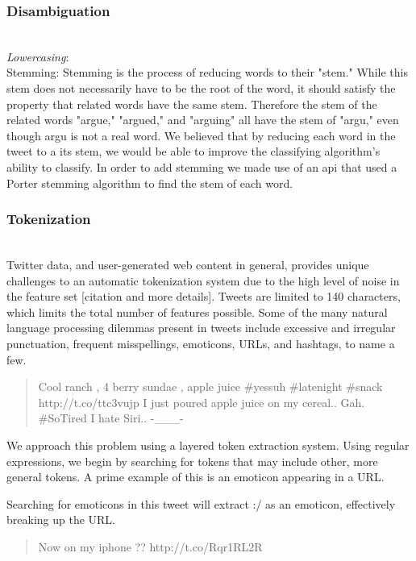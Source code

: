 \documentclass[letterpaper]{article}
\begin{document}
\subsubsection{Disambiguation}
~\\
\textit{Lowercasing}:\\
Stemming: Stemming is the process of reducing words to their "stem." While this stem does not necessarily have to be the root of the word, it should satisfy the property that related words have the same stem. Therefore the stem of the related words "argue," "argued," and "arguing" all have the stem of "argu," even though argu is not a real word. We believed that by reducing each word in the tweet to a its stem, we would be able to improve the classifying algorithm's ability to classify. In order to add stemming we made use of an api that used a Porter stemming algorithm to find the stem of each word.\\

\subsubsection{Tokenization}
~\\
Twitter data, and user-generated web content in general, provides unique challenges to an automatic tokenization system due to the high level of noise in the feature set [citation and more details]. Tweets are limited to 140 characters, which limits the total number of features possible. Some of the many natural language processing dilemmas present in tweets include excessive and irregular punctuation, frequent misspellings, emoticons, URLs, and hashtags, to name a few.\\

\begin{quote}
Cool ranch , 4 berry sundae , apple juice \#yessuh \#latenight \#snack http://t.co/ttc3vujp 
I just poured apple juice on my cereal.. Gah. \#SoTired 
I hate Siri.. -\_\_\_- 
\end{quote}

We approach this problem using a layered token extraction system. Using regular expressions, we begin by searching for tokens that may include other, more general tokens. A prime example of this is an emoticon appearing in a URL.

Searching for emoticons in this tweet will extract :/ as an emoticon, effectively breaking up the URL.
\begin{quote}
Now on my iphone ?? http://t.co/Rqr1RL2R 
\end{quote}
\end{document}
